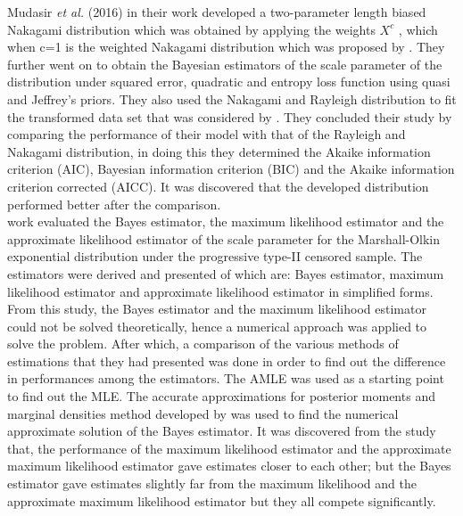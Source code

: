 \documentclass[a4paper,12pt]{report}
\newcommand{\para}{\hspace{0.5cm}}
\begin{document}
\noindent\para Mudasir \textit{et al.} (2016) in their work developed a two-parameter length biased Nakagami distribution which was obtained by applying the weights $X^c$ , which when c=1 is the weighted Nakagami distribution which was proposed by \cite{karagiannidis2001distribution}. They further went on to obtain the Bayesian estimators of the scale parameter of the distribution under squared error, quadratic and entropy loss function using quasi and Jeffrey’s priors. They also used the Nakagami and Rayleigh distribution to fit the transformed data set that was considered by \cite{kundu2005generalized}. They concluded their study by comparing the performance of their model with that of the Rayleigh and Nakagami distribution, in doing this they determined the Akaike information criterion (AIC), Bayesian information criterion (BIC) and the Akaike information criterion corrected (AICC). It was discovered that the developed distribution performed better after the comparison.\\

\noindent\para \cite{salah2018bayesian} work evaluated the Bayes estimator, the maximum likelihood estimator and the approximate likelihood estimator of the scale parameter for the Marshall-Olkin exponential distribution under the progressive type-II censored sample. The estimators were derived and presented of which are: Bayes estimator, maximum likelihood estimator and approximate likelihood estimator in simplified forms. From this study, the Bayes estimator and the maximum likelihood estimator could not be solved theoretically, hence a numerical approach was applied to solve the problem. After which, a comparison of the various methods of estimations that they had presented was done in order to find out the difference in performances among the estimators. The AMLE was used as a starting point to find out the MLE. The accurate approximations for posterior moments and marginal densities method developed by \cite{tierney1986accurate} was used to find the numerical approximate solution of the Bayes estimator. It was discovered from the study that, the performance of the maximum likelihood estimator and the approximate maximum likelihood estimator gave estimates closer to each other; but the Bayes estimator gave estimates slightly far from the maximum likelihood  and the approximate maximum likelihood estimator but they all compete significantly.\\
\end{document}
